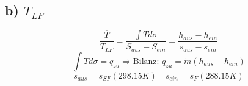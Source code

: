 \subsection*{b) $\overline{T}_{LF}$}
\[
\frac{\overline{T}}{T_{LF}} = \frac{\int T d\sigma}{S_{aus} - S_{ein}} = \frac{h_{aus} - h_{ein}}{s_{aus} - s_{ein}}
\]
\[
\int T d\sigma = q_{zu} \Rightarrow \text{Bilanz: } q_{zu} = \dot{m} (h_{aus} - h_{ein})
\]
\[
s_{aus} = s_{SF} (298.15 K) \quad s_{ein} = s_{F} (288.15 K)
\]